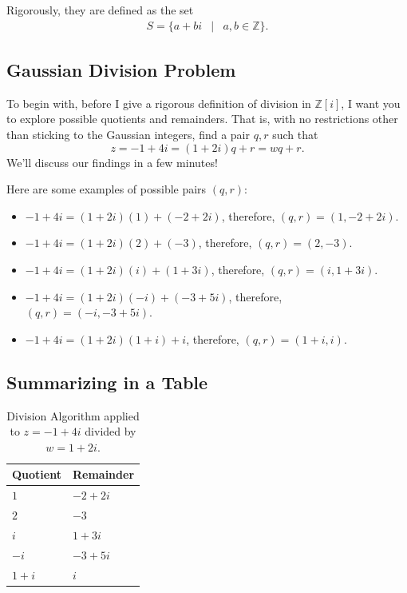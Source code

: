 Rigorously, they are defined as the set \begin{eqnarray*}S=\{a+bi &|& a,b \in \mathbb{Z}\}. \end{eqnarray*}  

\clearpage

\subsection{Gaussian Division Problem \cite{div:1}}


To begin with, before I give a rigorous definition of division in $\mathbb{Z}[i]$, I want you to explore possible quotients and remainders. That is, with no restrictions other than sticking to the Gaussian integers, find a pair $q,r$ such that $$z=-1+4i=(1+2i)q+r=wq+r.$$   We'll discuss our findings in a few minutes!

\clearpage

Here are some examples of possible pairs $(q,r)$:

\begin{itemize}
	\item $-1+4i=(1+2i)(1)+(-2+2i)$, therefore, $(q,r)=(1, -2+2i)$.
	\item $-1+4i=(1+2i)(2)+(-3)$, therefore, $(q,r)=(2, -3)$.
	\item $-1+4i=(1+2i)(i)+(1+3i)$, therefore, $(q,r)=(i, 1+3i)$.
	\item $-1+4i=(1+2i)(-i)+(-3+5i)$, therefore, $(q,r)=(-i, -3+5i)$.
	\item $-1+4i=(1+2i)(1+i)+i$, therefore, $(q,r)=(1+i, i)$.
\end{itemize}

\clearpage

\subsection*{Summarizing in a Table}

\begin{table}[h] 
	\centering
	\begin{tabular}{l l}
		\toprule
		Quotient & Remainder \\
		\midrule
		$1$ & $-2+2i$ \\
		$2$ & $-3$ \\ 
		$i$ & $1+3i$ \\
		$-i$ & $-3+5i$ \\
		$1+i$ & $i$ \\ 
		\bottomrule
		
	\end{tabular}
	
	\caption{Division Algorithm applied to $z=-1+4i$ divided by $w=1+2i$.}
	\label{tab:div}
\end{table}

